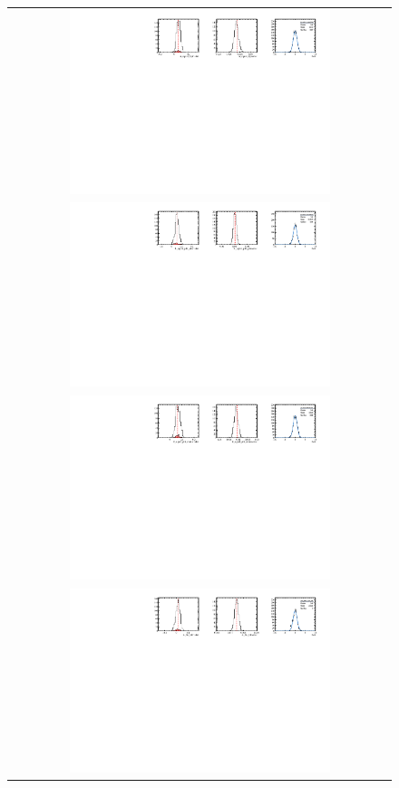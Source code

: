 \begin{figure}
  \centering
  \begin{tabular}{c}
\includegraphics[width=0.7\textwidth]{ANA_resources/Plots/Data_fit/FitterBias//A_signal_Kpi.pdf} \\
\includegraphics[width=0.7\textwidth]{ANA_resources/Plots/Data_fit/FitterBias//R_signal_piK_plus.pdf} \\
\includegraphics[width=0.7\textwidth]{ANA_resources/Plots/Data_fit/FitterBias//R_signal_piK_minus.pdf} \\
\includegraphics[width=0.7\textwidth]{ANA_resources/Plots/Data_fit/FitterBias//A_Bs_piK.pdf} \\

\end{tabular}
\end{figure}
